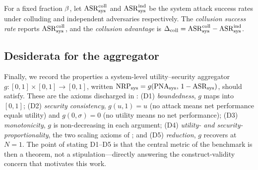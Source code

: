 \begin{definition}
\label{def:csr}
For a fixed fraction $\beta$, let $\mathrm{ASR}_{\mathrm{sys}}^{\mathrm{coll}}$ and $\mathrm{ASR}_{\mathrm{sys}}^{\mathrm{ind}}$ be
the system attack success rates under colluding and independent adversaries respectively.
The \emph{collusion success rate} reports $\mathrm{ASR}_{\mathrm{sys}}^{\mathrm{coll}}$, and the
\emph{collusion advantage} is $\Delta_{\mathrm{coll}}=\mathrm{ASR}_{\mathrm{sys}}^{\mathrm{coll}}-\mathrm{ASR}_{\mathrm{sys}}^{\mathrm{ind}}$.
\end{definition}

\subsection{Desiderata for the aggregator}
Finally, we record the properties a system-level utility--security aggregator
$g:[0,1]\times[0,1]\to[0,1]$, written $\mathrm{NRP}_{\mathrm{sys}}=g(\mathrm{PNA}_{\mathrm{sys}},\,1-\mathrm{ASR}_{\mathrm{sys}})$, should satisfy. These
are the axioms discharged in : (D1) \emph{boundedness}, $g$ maps into
$[0,1]$; (D2) \emph{security consistency}, $g(u,1)=u$ (no attack means net performance
equals utility) and $g(0,\sigma)=0$ (no utility means no net performance); (D3)
\emph{monotonicity}, $g$ is non-decreasing in each argument; (D4) \emph{utility- and
security-proportionality}, the two scaling axioms of ; and (D5)
\emph{reduction}, $g$ recovers  at $N=1$. The point of stating D1--D5 is
that the central metric of the benchmark is then a theorem, not a stipulation---directly
answering the construct-validity concern that motivates this work.
